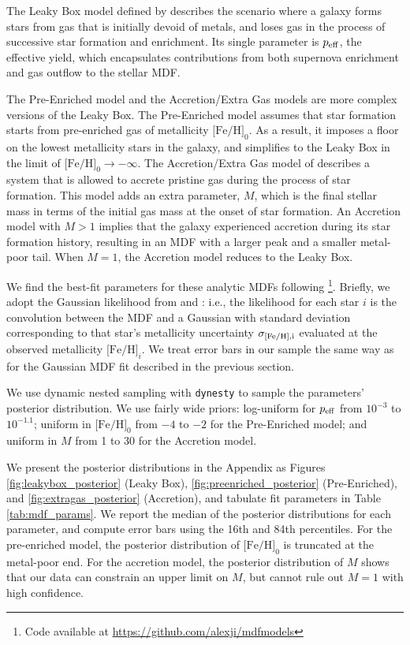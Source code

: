 \documentclass[twocolumn]{aastex63}
\begin{document}
\par The Leaky Box model defined by \citet{pagel1997} describes the scenario where a galaxy forms stars from gas that is initially devoid of metals, and loses gas in the process of successive star formation and enrichment. Its single parameter is $p_{\rm eff}$, the effective yield, which encapsulates contributions from both supernova enrichment and gas outflow to the stellar MDF. 

\par The Pre-Enriched model and the Accretion/Extra Gas models are more complex versions of the Leaky Box. The Pre-Enriched model assumes that star formation starts from pre-enriched gas of metallicity $\mbox{[Fe/H]}_0$. As a result, it imposes a floor on the lowest metallicity stars in the galaxy, and simplifies to the Leaky Box in the limit of $\mbox{[Fe/H]}_0 \to -\infty$. The Accretion/Extra Gas model of \citet{lynden-bell1975} describes a system that is allowed to accrete pristine gas during the process of star formation. This model adds an extra parameter, $M$, which is the final stellar mass in terms of the initial gas mass at the onset of star formation. An Accretion model with $M>1$ implies that the galaxy experienced accretion during its star formation history, resulting in an MDF with a larger peak and a smaller metal-poor tail. When $M=1$, the Accretion model reduces to the Leaky Box.

We find the best-fit parameters for these analytic MDFs following \citet{jenkins2021vlt,ji2021ant2cra2}\footnote{Code available at \url{https://github.com/alexji/mdfmodels}}.
Briefly, we adopt the Gaussian likelihood from \citet{kirby2011MDFs} and \citet{kirby2013LZR}: i.e., the likelihood for each star $i$ is the convolution between the MDF and a Gaussian with standard deviation corresponding to that star's metallicity uncertainty $\sigma_{\rm{[Fe/H]},i}$ evaluated at the observed metallicity $\mbox{[Fe/H]}_i$. We treat error bars in our sample the same way as for the Gaussian MDF fit described in the previous section.

\par We use dynamic nested sampling with \texttt{dynesty} \citep{dynesty} to sample the parameters' posterior distribution. We use fairly wide priors: log-uniform for $p_{\rm{eff}}$ from $10^{-3}$ to $10^{-1.1}$; uniform in $\mbox{[Fe/H]}_0$ from $-4$ to $-2$ for the Pre-Enriched model; and uniform in $M$ from 1 to 30 for the Accretion model.

\par We present the posterior distributions in the Appendix as Figures \ref{fig:leakybox_posterior} (Leaky Box), \ref{fig:preenriched_posterior} (Pre-Enriched), and \ref{fig:extragas_posterior} (Accretion), and tabulate fit parameters in Table \ref{tab:mdf_params}. We report the median of the posterior distributions for each parameter, and compute error bars using the 16th and 84th percentiles. For the pre-enriched model, the posterior distribution of $\mbox{[Fe/H]}_0$ is truncated at the metal-poor end. For the accretion model, the posterior distribution of $M$ shows that our data can constrain an upper limit on $M$, but cannot rule out $M=1$ with high confidence. 
\end{document}

